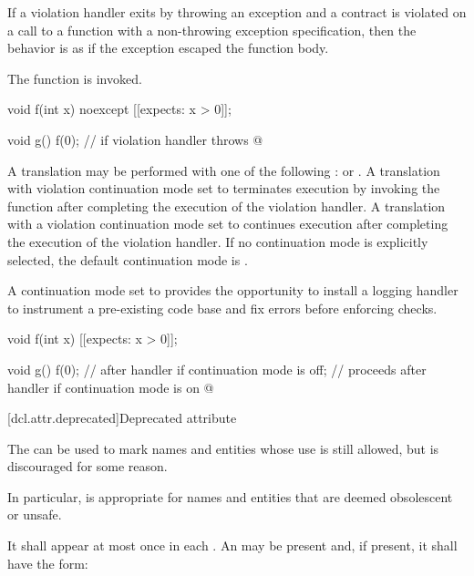 \pnum
If a violation handler exits by throwing an exception
and a contract is violated on a call to a function
with a non-throwing exception specification,
then the behavior is as if the exception escaped the function body.
\begin{note}
The function  is invoked.
\end{note}
\begin{example}
\begin{codeblock}
void f(int x) noexcept [[expects: x > 0]];

void g() {
  f(0);                                         //  if violation handler throws
  @\commentellip@
}
\end{codeblock}
\end{example}

\pnum
A translation may be performed with one of the following
:
 or .
A translation with violation continuation mode set to 
terminates execution
by invoking the function 
after completing the execution of the violation handler.
A translation with a violation continuation mode set to 
continues execution after completing the execution of the violation handler.
If no continuation mode is explicitly selected,
the default continuation mode is .
\begin{note}
A continuation mode set to  provides the opportunity
to install a logging handler to instrument a pre-existing code base
and fix errors before enforcing checks.
\end{note}
\begin{example}
\begin{codeblock}
void f(int x) [[expects: x > 0]];

void g() {
  f(0);         //  after handler if continuation mode is off;
                // proceeds after handler if continuation mode is on
  @\commentellip@
}
\end{codeblock}
\end{example}


[dcl.attr.deprecated]{Deprecated attribute}%

\pnum
The   can be used to mark names and entities
whose use is still allowed, but is discouraged for some reason. \begin{note} In particular,
 is appropriate for names and entities that are deemed obsolescent or
unsafe. \end{note} It shall appear at most once in each . An
 may be present and, if present, it shall have the form:

